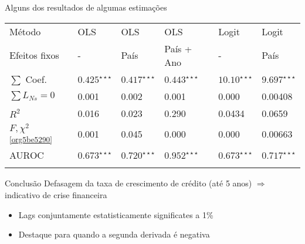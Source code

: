 \documentclass[presentation]{beamer}
\begin{document}
\begin{frame}[label={sec:org9dcb224}]{Alguns dos resultados de algumas estimações}
\begin{center}
\begin{center}
\begin{tabular}{llllll}
\hline
Método & OLS & OLS & OLS & Logit & Logit\\
Efeitos fixos & - & País & País + Ano & - & País\\
\hline
\(\sum\) Coef. & \(0.425^{\star\star\star}\) & \(0.417^{\star\star\star}\) & \(0.443^{\star\star\star}\) & \(10.10^{\star\star\star}\) & \(9.697^{\star\star\star}\)\\
\(\sum L_{Ns} = 0\)\footnotemark & 0.001 & 0.002 & 0.001 & 0.000 & 0.00408\\
\(R^2\) & 0.016 & 0.023 & 0.290 & 0.0434 & 0.0659\\
\(F, \chi^{2}\)\textsuperscript{\ref{org5be5290}} & 0.001 & 0.045 & 0.000 & 0.000 & 0.00663\\
AUROC & \(0.673^{\star\star\star}\) & \(0.720^{\star\star\star}\) & \(0.952^{\star\star\star}\) & \(0.673^{\star\star\star}\) & \(0.717^{\star\star\star}\)\\
\hline
 &  &  &  &  & \\
\end{tabular}
\end{center}
\end{center}


\begin{block}{Conclusão}
Defasagem da taxa de crescimento de crédito (até 5 anos) \(\Rightarrow\) indicativo de crise financeira
\begin{itemize}
\item Lags conjuntamente estatisticamente significates a 1\%
\item Destaque para quando a segunda derivada é negativa
\end{itemize}
\end{block}
\end{frame}
\end{document}
